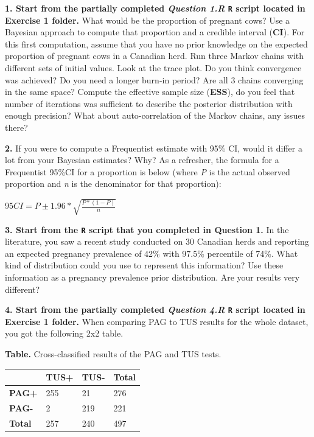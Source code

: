 \documentclass[
]{book}
\begin{document}
\textbf{1. Start from the partially completed \emph{Question 1.R}
\texttt{R} script located in Exercise 1 folder.} What would be the
proportion of pregnant cows? Use a Bayesian approach to compute that
proportion and a credible interval (\textbf{CI}). For this first
computation, assume that you have no prior knowledge on the expected
proportion of pregnant cows in a Canadian herd. Run three Markov chains
with different sets of initial values. Look at the trace plot. Do you
think convergence was achieved? Do you need a longer burn-in period? Are
all 3 chains converging in the same space? Compute the effective sample
size (\textbf{ESS}), do you feel that number of iterations was
sufficient to describe the posterior distribution with enough precision?
What about auto-correlation of the Markov chains, any issues there?

\textbf{2.} If you were to compute a Frequentist estimate with 95\% CI,
would it differ a lot from your Bayesian estimates? Why? As a refresher,
the formula for a Frequentist 95\%CI for a proportion is below (where
\emph{P} is the actual observed proportion and \emph{n} is the
denominator for that proportion):

\(95CI=P \pm 1.96* \sqrt{\frac{P*(1-P)}{n}}\)

\textbf{3. Start from the \texttt{R} script that you completed in
Question 1.} In the literature, you saw a recent study conducted on 30
Canadian herds and reporting an expected pregnancy prevalence of 42\%
with 97.5\% percentile of 74\%. What kind of distribution could you use
to represent this information? Use these information as a pregnancy
prevalence prior distribution. Are your results very different?

\textbf{4. Start from the partially completed \emph{Question 4.R}
\texttt{R} script located in Exercise 1 folder.} When comparing PAG to
TUS results for the whole dataset, you got the following 2x2 table.

\textbf{Table.} Cross-classified results of the PAG and TUS tests.

\begin{longtable}[]{@{}llll@{}}
\toprule
& \textbf{TUS+} & \textbf{TUS-} & \textbf{Total} \\
\midrule
\endhead
\textbf{PAG+} & 255 & 21 & 276 \\
\textbf{PAG-} & 2 & 219 & 221 \\
\textbf{Total} & 257 & 240 & 497 \\
\bottomrule
\end{longtable}
\end{document}
